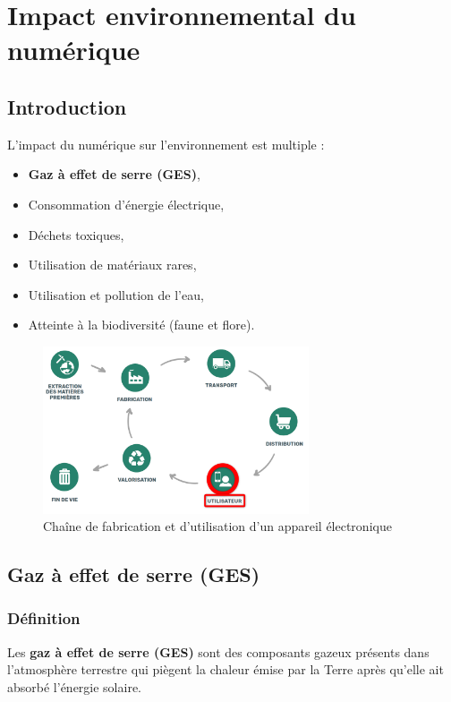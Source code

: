 \documentclass[11pt, a4paper]{book}
\begin{document}
\setcounter{chapter}{4}

\chapter{Impact environnemental du numérique}

\section{Introduction}
L’impact du numérique sur l’environnement est multiple :
\begin{itemize}
  \item \textbf{Gaz à effet de serre (GES)},
  \item Consommation d’énergie électrique,
  \item Déchets toxiques,
  \item Utilisation de matériaux rares,
  \item Utilisation et pollution de l’eau,
  \item Atteinte à la biodiversité (faune et flore).
\end{itemize}

\begin{figure}[h!]
  \centering
  \includegraphics[width=0.7\textwidth]{images/impact-eco/image11.png}
  \caption{Chaîne de fabrication et d'utilisation d'un appareil électronique}
  \label{fig:intro-impact}
\end{figure}

\section{Gaz à effet de serre (GES)}

\subsection{Définition}
Les \textbf{gaz à effet de serre (GES)} sont des composants gazeux présents dans l'atmosphère terrestre qui piègent la chaleur émise par la Terre après qu'elle ait absorbé l'énergie solaire. 
\end{document}
